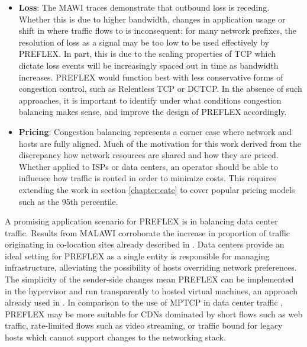 \begin{itemize}
\item{
    \textbf{Loss}: The \ac{MAWI} traces demonstrate that outbound loss is receding.
    Whether this is due to higher bandwidth, changes in application usage or shift in where traffic flows to is inconsequent: for many network prefixes, the resolution of loss as a signal may be too low to be used effectively by \ac{PREFLEX}.
    In part, this is due to the scaling properties of \ac{TCP} which dictate loss events will be increasingly spaced out in time as bandwidth increases.
    \ac{PREFLEX} would function best with less conservative forms of congestion control, such as Relentless \ac{TCP} or \ac{DCTCP}.
    In the absence of such approaches, it is important to identify under what conditions congestion balancing makes sense, and improve the design of \ac{PREFLEX} accordingly.
}

\item{
    \textbf{Pricing}: Congestion balancing represents a corner case where network and hosts are fully aligned. 
    Much of the motivation for this work derived from the discrepancy how network resources are shared and how they are priced.
    Whether applied to \acp{ISP} or data centers, an operator should be able to influence how traffic is routed in order to minimize costs.
    This requires extending the work in section \ref{chapter:cate} to cover popular pricing models such as the 95th percentile.
}
\end{itemize}

A promising application scenario for \ac{PREFLEX} is in balancing data center traffic.
Results from \ac{MALAWI} corroborate the increase in proportion of traffic originating in co-location sites already described in \cite{Labovitz:2010p175}.
Data centers provide an ideal setting for \ac{PREFLEX} as a single entity is responsible for managing infrastructure, alleviating the possibility of hosts overriding network preferences.
The simplicity of the sender-side changes mean \ac{PREFLEX} can be implemented in the hypervisor and run transparently to hosted virtual machines, an approach already used in \cite{Wu:2010p556}.
In comparison to the use of \ac{MPTCP} in data center traffic \cite{Raiciu:2011p539}, \ac{PREFLEX} may be more suitable for \acp{CDN} dominated by short flows such as web traffic, rate-limited flows such as video streaming, or traffic bound for legacy hosts which cannot support changes to the networking stack.





